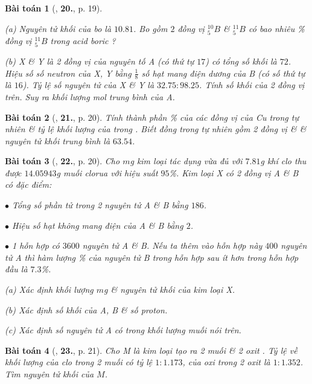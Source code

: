 \documentclass{article}
\numberwithin{equation}{section}
\newtheorem{baitoan}{Bài toán}[section]
\begin{document}
\begin{baitoan}[\cite{An2012}, \textbf{20.}, p. 19]
	\begin{enumerate*}
		\item[(a)] Nguyên tử khối của bo là $10.81$. Bo gồm $2$ đồng vị $_5^10B$ \& $_5^11B$ có bao nhiêu \% đồng vị $_5^11B$ trong acid boric \emph{}?
		\item[(b)] X \& Y là 2 đồng vị của nguyên tố A (có thứ tự $17$) có tổng số khối là $72$. Hiệu số số neutron của X, Y bằng $\frac{1}{8}$ số hạt mang điện dương của B (có số thứ tự là $16$). Tỷ lệ số nguyên tử của X \& Y là $32.75:98.25$. Tính số khối của 2 đồng vị trên. Suy ra khối lượng mol trung bình của A.
	\end{enumerate*}
\end{baitoan}

\begin{baitoan}[\cite{An2012}, \textbf{21.}, p. 20]
	Tính thành phần \% của các đồng vị của \emph{Cu} trong tự nhiên \& tỷ lệ khối lượng của \emph{} trong \emph{}. Biết đồng trong tự nhiên gồm 2 đồng vị \emph{} \& \emph{} \& nguyên tử khối trung bình là $63.54$.
\end{baitoan}

\begin{baitoan}[\cite{An2012}, \textbf{22.}, p. 20]
	Cho $m$\emph{g} kim loại tác dụng vừa đủ với $7.81$\emph{g} khí clo thu được $14.05943$\emph{g} muối clorua với hiệu suất $95$\%. Kim loại X có 2 đồng vị A \& B có đặc điểm:
	\begin{enumerate*}
		\item[$\bullet$] Tổng số phần tử trong 2 nguyên tử A \& B bằng $186$.
		\item[$\bullet$] Hiệu số hạt không mang điện của A \& B bằng $2$.
		\item[$\bullet$] 1 hỗn hợp có $3600$ nguyên tử A \& B. Nếu ta thêm vào hỗn hợp này $400$ nguyên tử A thì hàm lượng \% của nguyên tử B trong hỗn hợp sau ít hơn trong hỗn hợp đầu là $7.3$\%.
		\item[(a)] Xác định khối lượng $m$\emph{g} \& nguyên tử khối của kim loại X.
		\item[(b)] Xác định số khối của A, B \& số proton.
		\item[(c)] Xác định số nguyên tử A có trong khối lượng muối nói trên.
	\end{enumerate*}
\end{baitoan}

\begin{baitoan}[\cite{An2012}, \textbf{23.}, p. 21]
	Cho \emph{M} là kim loại tạo ra 2 muối \emph{} \& 2 oxit \emph{}. Tỷ lệ về khối lượng của clo trong 2 muối có tỷ lệ $1:1.173$, của oxi trong 2 oxit là $1:1.352$. Tìm nguyên tử khối của $M$.
\end{baitoan}
\end{document}
